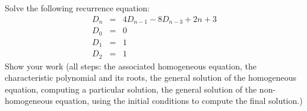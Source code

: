 \documentclass{article}
\begin{document}
\begin{problem}
Solve the following recurrence equation:
%
\begin{eqnarray*}
        D_n &=& 4D_{n-1} -8 D_{n-3} + 2n+3\\
        D_0 &=& 0 \\
        D_1 &=& 1 \\
		D_2 &=& 1
\end{eqnarray*}
%
Show your work (all steps: the associated homogeneous equation,
the characteristic polynomial and its
roots, the general solution of the homogeneous
equation, computing a particular solution,
the general solution of the non-homogeneous equation,
using the initial conditions to compute the final solution.)
\end{problem}

\end{document}
